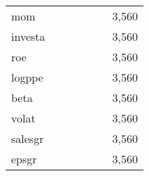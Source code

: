 {\begin{tabular}{l*{1}{cccccc}}
mom                 &            &            &            &            &            &       3,560\\
investa             &            &            &            &            &            &       3,560\\
roe                 &            &            &            &            &            &       3,560\\
logppe              &            &            &            &            &            &       3,560\\
beta                &            &            &            &            &            &       3,560\\
volat               &            &            &            &            &            &       3,560\\
salesgr             &            &            &            &            &            &       3,560\\
epsgr               &            &            &            &            &            &       3,560\\
\bottomrule
\end{tabular}
}
